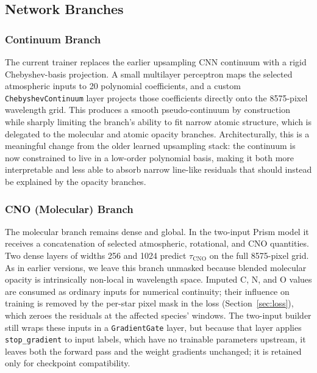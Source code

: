 \documentclass[preprint]{aastex701-1/aastex701}
\begin{document}
\subsection{Network Branches}
\label{subsec:branches}

\subsubsection{Continuum Branch}
The current trainer replaces the earlier upsampling CNN continuum with a rigid
Chebyshev-basis projection. A small multilayer perceptron maps the selected atmospheric
inputs to 20 polynomial coefficients, and a custom \texttt{ChebyshevContinuum} layer
projects those coefficients directly onto the 8575-pixel wavelength grid. This produces a
smooth pseudo-continuum by construction while sharply limiting the branch's ability to fit
narrow atomic structure, which is delegated to the molecular and atomic opacity branches.
Architecturally, this is a meaningful change from the older learned upsampling stack:
the continuum is now constrained to live in a low-order polynomial basis, making it both
more interpretable and less able to absorb narrow line-like residuals that should instead
be explained by the opacity branches.

\subsubsection{CNO (Molecular) Branch}
The molecular branch remains dense and global. In the two-input Prism model it receives a
concatenation of selected atmospheric, rotational, and CNO quantities. Two dense layers of
widths 256 and 1024 predict $\tau_\mathrm{CNO}$ on the full 8575-pixel grid. As in earlier
versions, we leave this branch unmasked because blended molecular opacity is intrinsically
non-local in wavelength space. Imputed C, N, and O values are consumed as ordinary inputs
for numerical continuity; their influence on training is removed by the per-star pixel mask
in the loss (Section~\ref{sec:loss}), which zeroes the residuals at the affected
species' windows. The two-input builder still wraps these inputs in a
\texttt{GradientGate} layer, but because that layer applies \texttt{stop\_gradient} to
input labels, which have no trainable parameters upstream, it leaves both the forward pass
and the weight gradients unchanged; it is retained only for checkpoint compatibility.
\end{document}
